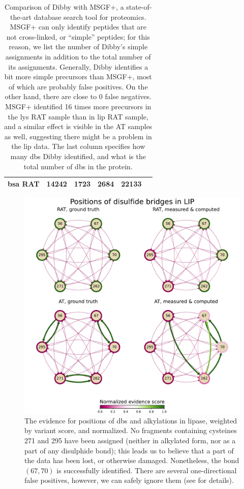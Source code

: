 \begin{table}[hb]
\begin{tabular}{@{}llllll@{}}
    \gls*{bsa} RAT                                       & 14242                           & 1723                                                                   & 2684                              & 22133 &             \\ \bottomrule
  \end{tabular}
  \caption{Comparison of Dibby with MSGF+, a state-of-the-art database search tool for proteomics. MSGF+ can only identify peptides that are not cross-linked, or ``simple'' peptides; for this reason, we list the number of Dibby's simple assignments in addition to the total number of its assignments. Generally, Dibby identifies a bit more simple precursors than MSGF+, most of which are probably false positives. On the other hand, there are close to 0 false negatives. MSGF+ identified 16 times more precursors in the \gls*{lys} RAT sample than in \gls*{lip} RAT sample, and a similar effect is visible in the AT samples as well, suggesting there might be a problem in the \gls*{lip} data. The last column specifies how many \glspl*{db} Dibby identified, and what is the total number of \glspl*{db} in the protein.}\label{tbl:measurements}
\end{table}

\begin{figure}
  \centering
  \includegraphics[width=0.9\linewidth]{img/pdfa-lip.pdf}
  \caption{The evidence for positions of \glspl*{db} and alkylations in lipase, weighted by variant score, and normalized. No fragments containing cysteines 271 and 295 have been assigned (neither in alkylated form, nor as a part of any disulphide bond); this leads us to believe that a part of the data has been lost, or otherwise damaged. Nonetheless, the bond \((67, 70)\) is successfully identified. There are several one-directional false positives, however, we can safely ignore them (see  for details).}\label{fig:lip}
\end{figure}

